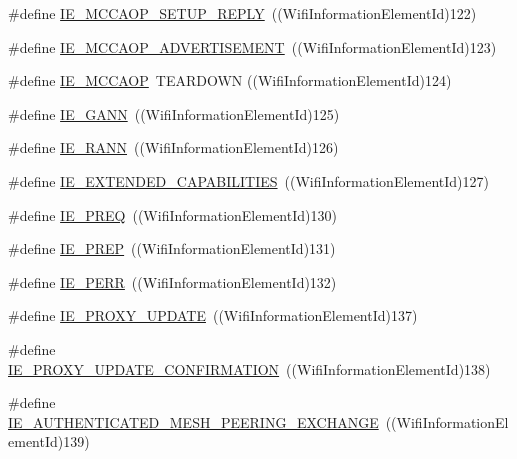 \begin{DoxyCompactItemize}
\item 
\#define \hyperlink{wifi-information-element_8h_a070e6ebe1ad6ccac86d29a83a5294b8b}{I\+E\+\_\+\+M\+C\+C\+A\+O\+P\+\_\+\+S\+E\+T\+U\+P\+\_\+\+R\+E\+P\+LY}~((Wifi\+Information\+Element\+Id)122)
\item 
\#define \hyperlink{wifi-information-element_8h_a6fb743b1e76c0214dbe6d4eb1118cdf8}{I\+E\+\_\+\+M\+C\+C\+A\+O\+P\+\_\+\+A\+D\+V\+E\+R\+T\+I\+S\+E\+M\+E\+NT}~((Wifi\+Information\+Element\+Id)123)
\item 
\#define \hyperlink{wifi-information-element_8h_ad900b9a72ccbe56bf745b91012d11c58}{I\+E\+\_\+\+M\+C\+C\+A\+OP}~T\+E\+A\+R\+D\+O\+WN                      ((Wifi\+Information\+Element\+Id)124)
\item 
\#define \hyperlink{wifi-information-element_8h_a0784e29ee9456610f034768e0519e6f7}{I\+E\+\_\+\+G\+A\+NN}~((Wifi\+Information\+Element\+Id)125)
\item 
\#define \hyperlink{wifi-information-element_8h_a46d8a8db46e528387990a68896ea024a}{I\+E\+\_\+\+R\+A\+NN}~((Wifi\+Information\+Element\+Id)126)
\item 
\#define \hyperlink{wifi-information-element_8h_abe48e62df3802aa3063224cdeb8bedba}{I\+E\+\_\+\+E\+X\+T\+E\+N\+D\+E\+D\+\_\+\+C\+A\+P\+A\+B\+I\+L\+I\+T\+I\+ES}~((Wifi\+Information\+Element\+Id)127)
\item 
\#define \hyperlink{wifi-information-element_8h_a2d91556437a285af73b9cdfcc30ebbea}{I\+E\+\_\+\+P\+R\+EQ}~((Wifi\+Information\+Element\+Id)130)
\item 
\#define \hyperlink{wifi-information-element_8h_a6687bfc3f6a8fca8ae00c46d3e8a3585}{I\+E\+\_\+\+P\+R\+EP}~((Wifi\+Information\+Element\+Id)131)
\item 
\#define \hyperlink{wifi-information-element_8h_aea089619cd634dc05b2268c2f9b4a7ee}{I\+E\+\_\+\+P\+E\+RR}~((Wifi\+Information\+Element\+Id)132)
\item 
\#define \hyperlink{wifi-information-element_8h_a8e9a81eba4f10bf5533760754d244718}{I\+E\+\_\+\+P\+R\+O\+X\+Y\+\_\+\+U\+P\+D\+A\+TE}~((Wifi\+Information\+Element\+Id)137)
\item 
\#define \hyperlink{wifi-information-element_8h_a58161194044b6b058b9303c4adcbc703}{I\+E\+\_\+\+P\+R\+O\+X\+Y\+\_\+\+U\+P\+D\+A\+T\+E\+\_\+\+C\+O\+N\+F\+I\+R\+M\+A\+T\+I\+ON}~((Wifi\+Information\+Element\+Id)138)
\item 
\#define \hyperlink{wifi-information-element_8h_ad23992954742e71f36d4811562eeca00}{I\+E\+\_\+\+A\+U\+T\+H\+E\+N\+T\+I\+C\+A\+T\+E\+D\+\_\+\+M\+E\+S\+H\+\_\+\+P\+E\+E\+R\+I\+N\+G\+\_\+\+E\+X\+C\+H\+A\+N\+GE}~((Wifi\+Information\+Element\+Id)139)

\end{DoxyCompactItemize}
